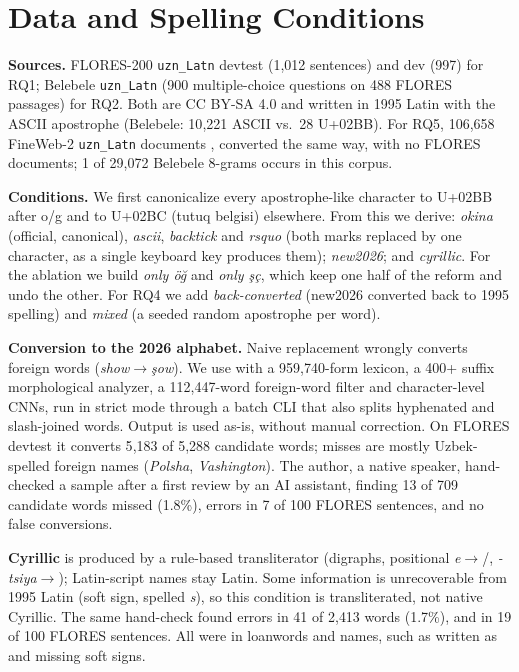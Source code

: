 \section{Data and Spelling Conditions}
\label{sec:data}
\textbf{Sources.} FLORES-200 \texttt{uzn\_Latn} devtest (1{,}012 sentences) and dev (997) \citep{nllb2022} for RQ1; Belebele \texttt{uzn\_Latn} \citep{bandarkar2024} (900 multiple-choice questions on 488 FLORES passages) for RQ2. Both are CC BY-SA 4.0 and written in 1995 Latin with the ASCII apostrophe (Belebele: 10{,}221 ASCII vs.\ 28 U+02BB). For RQ5, 106{,}658 FineWeb-2 \texttt{uzn\_Latn} documents \citep{fineweb2}, converted the same way, with no FLORES documents; 1 of 29{,}072 Belebele 8-grams occurs in this corpus.

\textbf{Conditions.} We first canonicalize every apostrophe-like character to U+02BB after o/g and to U+02BC (tutuq belgisi) elsewhere. From this we derive: \emph{okina} (official, canonical), \emph{ascii}, \emph{backtick} and \emph{rsquo} (both marks replaced by one character, as a single keyboard key produces them); \emph{new2026}; and \emph{cyrillic}. For the ablation we build \emph{only \"o\u{g}} and \emph{only \c{s}\c{c}}, which keep one half of the reform and undo the other. For RQ4 we add \emph{back-converted} (new2026 converted back to 1995 spelling) and \emph{mixed} (a seeded random apostrophe per word).

\textbf{Conversion to the 2026 alphabet.} Naive replacement wrongly converts foreign words (\emph{show}$\to$\emph{\c{s}ow}). We use \convuse{} with a 959{,}740-form lexicon, a 400+ suffix morphological analyzer, a 112{,}447-word foreign-word filter and character-level CNNs, run in strict mode through a batch CLI that also splits hyphenated and slash-joined words. Output is used as-is, without manual correction. On FLORES devtest it converts 5{,}183 of 5{,}288 candidate words; misses are mostly Uzbek-spelled foreign names (\emph{Polsha}, \emph{Vashington}). The author, a native speaker, hand-checked a sample after a first review by an AI assistant, finding 13 of 709 candidate words missed (1.8\%), errors in 7 of 100 FLORES sentences, and no false conversions.

\textbf{Cyrillic} is produced by a rule-based transliterator (digraphs, positional \emph{e}$\to$/, \emph{-tsiya}$\to$); Latin-script names stay Latin. Some information is unrecoverable from 1995 Latin (soft sign,  spelled \emph{s}), so this condition is transliterated, not native Cyrillic. The same hand-check found errors in 41 of 2{,}413 words (1.7\%), and in 19 of 100 FLORES sentences. All were in loanwords and names, such as  written as  and missing soft signs.

